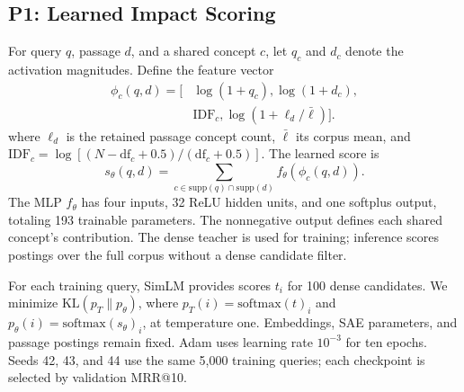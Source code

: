 \subsection{P1: Learned Impact Scoring}
For query $q$, passage $d$, and a shared concept $c$, let $q_c$ and $d_c$ denote
the activation magnitudes. Define the feature vector
\begin{equation}
\begin{split}
\phi_c(q,d)=\big[&\log(1+q_c),\log(1+d_c),\\
&\mathrm{IDF}_c,\log(1+\ell_d/\bar\ell)\big].
\end{split}
\end{equation}
where $\ell_d$ is the retained passage concept count, $\bar\ell$ its corpus
mean, and $\mathrm{IDF}_c=\log[(N-\mathrm{df}_c+0.5)/(\mathrm{df}_c+0.5)]$.
The learned score is
\begin{equation}
s_\theta(q,d)=\sum_{c\in\mathrm{supp}(q)\cap\mathrm{supp}(d)}
f_\theta(\phi_c(q,d)).
\end{equation}
The MLP $f_\theta$ has four inputs, 32 ReLU hidden units, and one softplus
output, totaling 193 trainable parameters. The nonnegative output defines
each shared concept's contribution. The dense teacher is used for training;
inference scores postings over the full corpus without a dense candidate filter.

For each training query, SimLM provides scores $t_i$ for 100 dense candidates.
We minimize $\mathrm{KL}(p_T\|p_\theta)$, where
$p_T(i)=\mathrm{softmax}(t)_i$ and
$p_\theta(i)=\mathrm{softmax}(s_\theta)_i$, at temperature one.
Embeddings, SAE parameters, and passage postings remain fixed. Adam uses
learning rate $10^{-3}$ for ten epochs. Seeds 42, 43, and 44 use the same
5,000 training queries; each checkpoint is selected by validation MRR@10.
